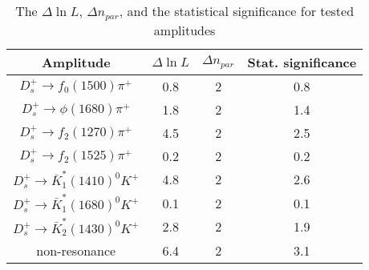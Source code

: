 {\begin{table}
    \caption{The $\Delta\ln L$, $\Delta n_{par}$, and the statistical significance for tested amplitudes}
    \label{test-significance-table}
    \begin{center}
        \begin{tabular}{cccc}
            \toprule
            Amplitude & $\Delta\ln L$ & $\Delta n_{par}$ & Stat. significance\\
            \hline
            $D_{s}^{+} \rightarrow f_{0}(1500)\pi^{+}$                     & 0.8        & 2   & 0.8\\
            $D_{s}^{+} \rightarrow \phi(1680)\pi^{+}$                      & 1.8        & 2   & 1.4\\
            $D_{s}^{+} \rightarrow f_{2}(1270)\pi^{+}$                     & 4.5        & 2   & 2.5\\
            $D_{s}^{+} \rightarrow f_{2}(1525)\pi^{+}$                     & 0.2        & 2   & 0.2\\
            $D_{s}^{+} \rightarrow \bar{K}_{1}^{*}(1410)^{0}K^{+}$         & 4.8        & 2   & 2.6\\
            $D_{s}^{+} \rightarrow \bar{K}_{1}^{*}(1680)^{0}K^{+}$         & 0.1        & 2   & 0.1\\
            $D_{s}^{+} \rightarrow \bar{K}_{2}^{*}(1430)^{0}K^{+}$         & 2.8        & 2   & 1.9\\
            non-resonance                                                  & 6.4        & 2   & 3.1\\
            \bottomrule
        \end{tabular}
    \end{center}
\end{table}

}

